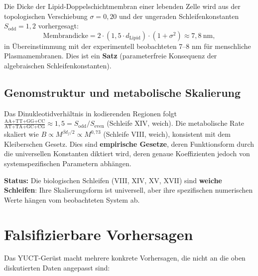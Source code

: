\documentclass[12pt,a4paper]{article}
\begin{document}
	Die Dicke der Lipid-Doppelschichtmembran einer lebenden Zelle wird aus der topologischen Verschiebung \(\sigma = 0,20\) und der ungeraden Schleifenkonstanten \(S_{\mathrm{odd}} = 1,2\) vorhergesagt:
	\[
	\text{Membrandicke} = 2 \cdot (1,5 \cdot d_{\mathrm{Lipid}}) \cdot (1 + \sigma^2) \approx 7,8\ \mathrm{nm},
	\]
	in Übereinstimmung mit der experimentell beobachteten 7--8 nm für menschliche Plasmamembranen. Dies ist ein \textbf{Satz} (parameterfreie Konsequenz der algebraischen Schleifenkonstanten).
	
	\subsection{Genomstruktur und metabolische Skalierung}
	
	Das Dinukleotidverhältnis in kodierenden Regionen folgt \(\frac{\text{AA+TT+GG+CC}}{\text{AT+TA+GC+CG}} \approx 1,5 = S_{\mathrm{odd}}/S_{\mathrm{even}}\) (Schleife XIV, weich). Die metabolische Rate skaliert wie \(B \propto M^{\beta d_f/2} \propto M^{0,73}\) (Schleife VIII, weich), konsistent mit dem Kleiberschen Gesetz. Dies sind \textbf{empirische Gesetze}, deren Funktionsform durch die universellen Konstanten diktiert wird, deren genaue Koeffizienten jedoch von systemspezifischen Parametern abhängen.
	
	\textbf{Status:} Die biologischen Schleifen (VIII, XIV, XV, XVII) sind \textbf{weiche Schleifen}: Ihre Skalierungsform ist universell, aber ihre spezifischen numerischen Werte hängen vom beobachteten System ab.
	
	\section{Falsifizierbare Vorhersagen}
	\label{sec:predictions}
	
	Das YUCT-Gerüst macht mehrere konkrete Vorhersagen, die nicht an die oben diskutierten Daten angepasst sind:
	
\end{document}
